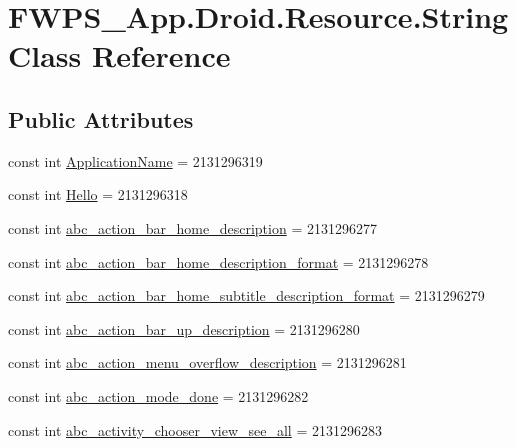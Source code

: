 \hypertarget{class_f_w_p_s___app_1_1_droid_1_1_resource_1_1_string}{}\section{F\+W\+P\+S\+\_\+\+App.\+Droid.\+Resource.\+String Class Reference}
\label{class_f_w_p_s___app_1_1_droid_1_1_resource_1_1_string}
\subsection*{Public Attributes}
\begin{DoxyCompactItemize}
\item 
const int \mbox{\hyperlink{class_f_w_p_s___app_1_1_droid_1_1_resource_1_1_string_a2bbc6b92fecc38dc18d29bc205761cbd}{Application\+Name}} = 2131296319
\item 
const int \mbox{\hyperlink{class_f_w_p_s___app_1_1_droid_1_1_resource_1_1_string_a2e463095dcac7b3871386f17030d5f14}{Hello}} = 2131296318
\item 
const int \mbox{\hyperlink{class_f_w_p_s___app_1_1_droid_1_1_resource_1_1_string_a302651be044918695d340a2d7190565d}{abc\+\_\+action\+\_\+bar\+\_\+home\+\_\+description}} = 2131296277
\item 
const int \mbox{\hyperlink{class_f_w_p_s___app_1_1_droid_1_1_resource_1_1_string_a482d95994c0e68b2e461273702ffc208}{abc\+\_\+action\+\_\+bar\+\_\+home\+\_\+description\+\_\+format}} = 2131296278
\item 
const int \mbox{\hyperlink{class_f_w_p_s___app_1_1_droid_1_1_resource_1_1_string_a27631f1f3cde7b2e9231edf20ca4469b}{abc\+\_\+action\+\_\+bar\+\_\+home\+\_\+subtitle\+\_\+description\+\_\+format}} = 2131296279
\item 
const int \mbox{\hyperlink{class_f_w_p_s___app_1_1_droid_1_1_resource_1_1_string_aa5239543875ccad978bfd6ac7680e8fe}{abc\+\_\+action\+\_\+bar\+\_\+up\+\_\+description}} = 2131296280
\item 
const int \mbox{\hyperlink{class_f_w_p_s___app_1_1_droid_1_1_resource_1_1_string_ae55c2b83927e6ad18efe24e21e81772e}{abc\+\_\+action\+\_\+menu\+\_\+overflow\+\_\+description}} = 2131296281
\item 
const int \mbox{\hyperlink{class_f_w_p_s___app_1_1_droid_1_1_resource_1_1_string_aa15e930913d9c93eede9f856921f750c}{abc\+\_\+action\+\_\+mode\+\_\+done}} = 2131296282
\item 
const int \mbox{\hyperlink{class_f_w_p_s___app_1_1_droid_1_1_resource_1_1_string_a6e4b0210acebe621059ab57d612c9e9c}{abc\+\_\+activity\+\_\+chooser\+\_\+view\+\_\+see\+\_\+all}} = 2131296283

\end{DoxyCompactItemize}
